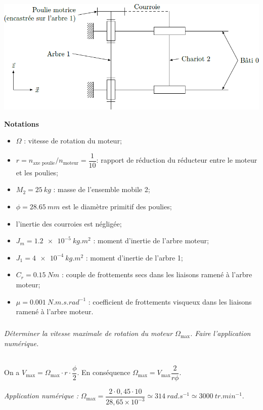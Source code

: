 \documentclass[10pt,fleqn]{article} %
\begin{document}
\begin{multicols}{2}
\begin{center}
\includegraphics[width=\linewidth]{images/fig_05}
\end{center}

\noindent\textbf{Notations}
\begin{itemize}
\item $\Omega$ : vitesse de rotation du moteur;
\item $r=n_{\text{axe poulie}}/n_{\text{moteur}}=\dfrac{1}{10}$: rapport de réduction du réducteur entre le moteur et les poulies;
\item $M_2 = \SI{25}{kg}$ : masse de l’ensemble mobile 2;
\item $\phi = \SI{28,65}{mm}$ est le diamètre primitif des poulies;
\item l’inertie des courroies est négligée;
\item $J_m = \SI{1,2e-5}{kg.m^2}$ : moment d’inertie de l’arbre moteur;
\item $J_1 = \SI{4e-4}{kg.m^2}$ : moment d’inertie de l’arbre 1;
\item $C_r = \SI{0,15}{Nm}$ : couple de frottements secs dans les liaisons ramené à l’arbre moteur;
\item $\mu = \SI{0,001}{N.m.s.rad^{-1}}$ : coefficient de frottements visqueux dans les liaisons ramené à l’arbre moteur.
\end{itemize}

\subparagraph{}\textit{Déterminer la vitesse maximale de rotation du moteur $\Omega_{\text{max}}$. Faire l’application numérique.}
\ifprof
\begin{corrige}~\\
On a $V_{\text{max}}=\Omega_{\text{max}}\cdot r \cdot \dfrac{\phi}{2}$. En conséquence 
$\Omega_{\text{max}}=V_{\text{max}}\dfrac{2}{r \phi}$. 

\textit{Application numérique :} $\Omega_{\text{max}}=\dfrac{2\cdot 0,45 \cdot 10}{28,65\times 10^{-3}}\simeq\SI{314}{rad.s^{-1}}\simeq\SI{3000}{tr.min^{-1}}$.


\end{corrige}
\end{multicols}
\end{document}
